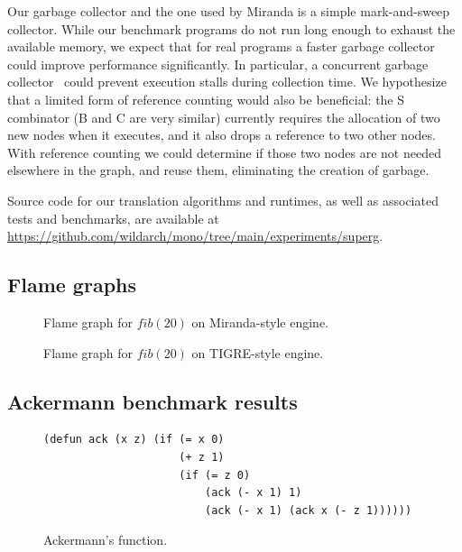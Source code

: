 \documentclass[conference]{IEEEtran}
\begin{document}
Our garbage collector and the one used by Miranda is a simple mark-and-sweep collector.
While our benchmark programs do not run long enough to exhaust the available memory, we expect that for real programs a faster garbage collector could improve performance significantly.
In particular, a concurrent garbage collector~\cite{jones_garbage_2011} could prevent execution stalls during collection time.
We hypothesize that a limited form of reference counting would also be beneficial: the S combinator (B and C are very similar) currently requires the allocation of two new nodes when it executes, and it also drops a reference to two other nodes.
With reference counting we could determine if those two nodes are not needed elsewhere in the graph, and reuse them, eliminating the creation of garbage.

Source code for our translation algorithms and runtimes, as well as associated tests and benchmarks, are available at \url{https://github.com/wildarch/mono/tree/main/experiments/superg}.





\appendix

\subsection{Flame graphs}
\label{app:flame-graph}
\begin{figure}
    
    \centering
    \caption{Flame graph for $fib(20)$ on Miranda-style engine.}
    \label{fig:flamegraph-turner}
\end{figure}

\begin{figure}
    
    \centering
    \caption{Flame graph for $fib(20)$ on TIGRE-style engine.}
    \label{fig:flamegraph-tigre}
\end{figure}

\newpage

\subsection{Ackermann benchmark results}
\label{app:ack}

\begin{figure}
    \begin{lstlisting}
(defun ack (x z) (if (= x 0)
                     (+ z 1)
                     (if (= z 0)
                         (ack (- x 1) 1)
                         (ack (- x 1) (ack x (- z 1))))))
    \end{lstlisting}
    \centering
    \caption{
        Ackermann's function.
    }
    \label{fig:ack}
\end{figure}
\end{document}
